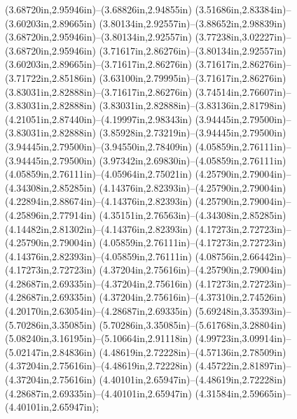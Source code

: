 (3.68720in,2.95946in)--(3.68826in,2.94855in) (3.51686in,2.83384in)--(3.60203in,2.89665in) (3.80134in,2.92557in)--(3.88652in,2.98839in) (3.68720in,2.95946in)--(3.80134in,2.92557in) (3.77238in,3.02227in)--(3.68720in,2.95946in) (3.71617in,2.86276in)--(3.80134in,2.92557in) (3.60203in,2.89665in)--(3.71617in,2.86276in) (3.71617in,2.86276in)--(3.71722in,2.85186in) (3.63100in,2.79995in)--(3.71617in,2.86276in) (3.83031in,2.82888in)--(3.71617in,2.86276in) (3.74514in,2.76607in)--(3.83031in,2.82888in) (3.83031in,2.82888in)--(3.83136in,2.81798in) (4.21051in,2.87440in)--(4.19997in,2.98343in) (3.94445in,2.79500in)--(3.83031in,2.82888in) (3.85928in,2.73219in)--(3.94445in,2.79500in) (3.94445in,2.79500in)--(3.94550in,2.78409in) (4.05859in,2.76111in)--(3.94445in,2.79500in) (3.97342in,2.69830in)--(4.05859in,2.76111in) (4.05859in,2.76111in)--(4.05964in,2.75021in) (4.25790in,2.79004in)--(4.34308in,2.85285in) (4.14376in,2.82393in)--(4.25790in,2.79004in) (4.22894in,2.88674in)--(4.14376in,2.82393in) (4.25790in,2.79004in)--(4.25896in,2.77914in) (4.35151in,2.76563in)--(4.34308in,2.85285in) (4.14482in,2.81302in)--(4.14376in,2.82393in) (4.17273in,2.72723in)--(4.25790in,2.79004in) (4.05859in,2.76111in)--(4.17273in,2.72723in) (4.14376in,2.82393in)--(4.05859in,2.76111in) (4.08756in,2.66442in)--(4.17273in,2.72723in) (4.37204in,2.75616in)--(4.25790in,2.79004in) (4.28687in,2.69335in)--(4.37204in,2.75616in) (4.17273in,2.72723in)--(4.28687in,2.69335in) (4.37204in,2.75616in)--(4.37310in,2.74526in) (4.20170in,2.63054in)--(4.28687in,2.69335in) (5.69248in,3.35393in)--(5.70286in,3.35085in) (5.70286in,3.35085in)--(5.61768in,3.28804in) (5.08240in,3.16195in)--(5.10664in,2.91118in) (4.99723in,3.09914in)--(5.02147in,2.84836in) (4.48619in,2.72228in)--(4.57136in,2.78509in) (4.37204in,2.75616in)--(4.48619in,2.72228in) (4.45722in,2.81897in)--(4.37204in,2.75616in) (4.40101in,2.65947in)--(4.48619in,2.72228in) (4.28687in,2.69335in)--(4.40101in,2.65947in) (4.31584in,2.59665in)--(4.40101in,2.65947in);
